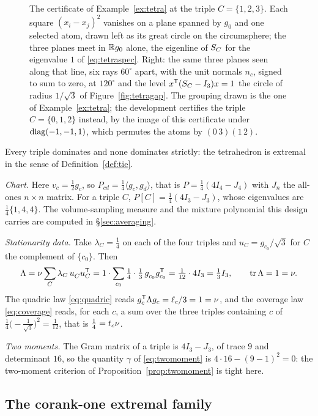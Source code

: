 \begin{figure}[ht]
  \centering
  
  \caption{The certificate of Example~\ref{ex:tetra} at the triple
  $C=\{1,2,3\}$.  Each square $(x_i-x_j)^2$ vanishes on a plane spanned by
  $g_0$ and one selected atom, drawn left as its great circle on the
  circumsphere; the three planes meet in $\mathbb{R} g_0$ alone, the eigenline of
  $S_{C}$ for the eigenvalue $1$ of \eqref{eq:tetraspec}.  Right: the same three
  planes seen along that line, six rays $60^{\circ}$ apart, with the unit
  normals $n_c$, signed to sum to zero, at $120^{\circ}$ and the level
  $x^{\mathsf{T}}(S_{C}-I_3)x=1$ the circle of radius $1/\sqrt3$ of
  Figure~\ref{fig:tetragap}.  The grouping drawn is
  the one of Example~\ref{ex:tetra}; the development certifies the triple
  $C=\{0,1,2\}$ instead, by the image of this certificate under
  $\operatorname{diag}(-1,-1,1)$, which permutes the atoms by $(0\,3)(1\,2)$.}
  \label{fig:tetracert}
\end{figure}

Every triple dominates and none dominates strictly: the tetrahedron is
extremal in the sense of Definition~\ref{def:tie}.

\emph{Chart.}  Here $v_c=\tfrac12 g_c$, so
$P_{cd}=\tfrac14\langle g_c,g_d\rangle$, that is $P=\tfrac14(4I_4-J_4)$ with
$J_n$ the all-ones $n\times n$ matrix.  For a triple $C$,
$P[C]=\tfrac14(4I_3-J_3)$, whose eigenvalues are $\tfrac14\{1,4,4\}$.  The
volume-sampling measure and the mixture polynomial this design carries are
computed in \S\ref{sec:averaging}.

\emph{Stationarity data.}  Take $\lambda_C=\tfrac14$ on each of the four
triples and $u_C=g_{c_0}/\sqrt3$ for $C$ the complement of $\{c_0\}$.  Then
\[
  \Lambda=\cv\sum_C\lambda_C\,u_C^{\vphantom{\mathsf{T}}}u_C\tp
   =1\cdot\sum_{c_0}\tfrac14\cdot\tfrac13\,g_{c_0}^{\vphantom{\mathsf{T}}}g_{c_0}\tp
   =\tfrac1{12}\cdot4I_3=\tfrac13 I_3,
  \qquad \tr\Lambda=1=\cv .
\]
The quadric law \eqref{eq:quadric} reads $g_c^{\mathsf{T}}\Lambda g_c=\ell_c/3=1=\nu$, and
the coverage law \eqref{eq:coverage} reads, for each $c$, a sum over the three
triples containing $c$ of $\tfrac14\bigl(-\tfrac1{\sqrt3}\bigr)^2=\tfrac1{12}$,
that is $\tfrac14=t_c\nu$.

\emph{Two moments.}  The Gram matrix of a triple is $4I_3-J_3$, of trace $9$
and determinant $16$, so the quantity $\gamma$ of \eqref{eq:twomoment} is
$4\cdot16-(9-1)^2=0$: the two-moment criterion of
Proposition~\ref{prop:twomoment} is tight here.

\subsection{The corank-one extremal family}\label{app:corankone}

